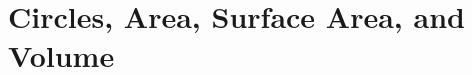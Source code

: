 \documentclass[12pt, fleqn, openany, oneside]{studyGuide}
\begin{document}

\chapter{Circles, Area, Surface Area, and Volume}










\printAnswerKey
\end{document}
